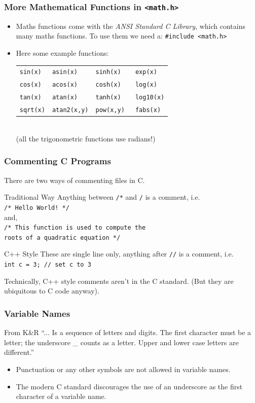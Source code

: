 \documentclass[table]{beamer}
\newif\ifschigh\schighfalse
\newcommand{\kw}[1]{\ifschigh\textcolor{red}{#1}\else\textcolor{keyword}{#1}\fi}
\newcommand{\kt}[1]{\ifschigh\textcolor{red}{#1}\else\textcolor{ctext}{#1}\fi}
\newcommand{\kc}[1]{\ifschigh\textcolor{red}{#1}\else\textcolor{comment}{#1}\fi}
\begin{document}
\begin{frame}
\frametitle{More Mathematical Functions in \kt{\tt <math.h>}}
\begin{itemize}
\item Maths functions come with the \emph{ANSI Standard C Library}, which contains many maths functions. To use them we need a:
{\tt \kw{\#include} \kt{<math.h>}}
\item Here some example functions:
\begin{tabular}{l l l l}
\tt sin(x)&\tt asin(x) & \tt sinh(x) & \tt exp(x)\\
\tt cos(x)&\tt acos(x) & \tt cosh(x) & \tt log(x)\\
\tt tan(x)&\tt atan(x) & \tt tanh(x) & \tt log10(x)\\
\tt sqrt(x)&\tt atan2(x,y)&\tt pow(x,y) & \tt fabs(x)
\end{tabular}\\
\vspace{1ex}
(all the trigonometric functions use radians!)
\end{itemize}
\end{frame}

\begin{frame}
\frametitle{Commenting C Programs}
There are two ways of commenting files in C.

\begin{block}{Traditional Way}
Anything between {\tt /*} and {\tt */} is a comment, i.e.\\
\kc{\tt /* Hello World! */}\\
and,\\
{\tt \kc{/* This function is used to compute the} }\\
{\tt \kc{roots of a quadratic equation */}}
\end{block}

\begin{block}{C++ Style}
These are single line only, anything after {\tt //} is a comment, i.e.\\
{\tt \kw{int} c = 3; \kc{// set c to 3}}
\end{block}

\begin{alertblock}{}
Technically, C++ style comments aren't in the C standard. (But they are
ubiquitous to C code anyway).
\end{alertblock}
\end{frame}

\begin{frame}
\frametitle{Variable Names}
\begin{block}{From K\&R}
``... Is a sequence of letters and digits. The first character must be a letter; the underscore \_ counts as a letter. Upper and lower case letters are different.''
\end{block}

\begin{itemize}
\item Punctuation or any other symbols are not allowed in variable names.
\item The modern C standard discourages the use of an underscore as the first character of a variable name.
\end{itemize}
\end{frame}
\end{document}

